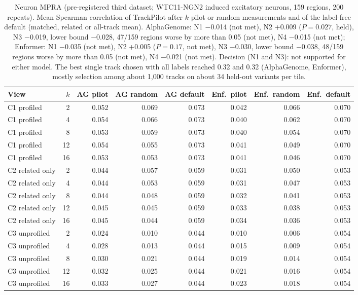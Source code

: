 \begin{table}[H]
\caption{Neuron MPRA (pre-registered third dataset; WTC11-NGN2 induced excitatory neurons, 159 regions, 200 repeats). Mean Spearman correlation of TrackPilot after $k$ pilot or random measurements and of the label-free default (matched, related or all-track mean). AlphaGenome: N1 $-$0.014 (not met), N2 +0.009 ($P=0.027$, held), N3 $-$0.019, lower bound $-$0.028, 47/159 regions worse by more than 0.05 (not met), N4 $-$0.015 (not met); Enformer: N1 $-$0.035 (not met), N2 +0.005 ($P=0.17$, not met), N3 $-$0.030, lower bound $-$0.038, 48/159 regions worse by more than 0.05 (not met), N4 $-$0.021 (not met). Decision (N1 and N3): not supported for either model. The best single track chosen with all labels reached 0.32 and 0.32 (AlphaGenome, Enformer), mostly selection among about 1,000 tracks on about 34 held-out variants per tile.}\label{tab:s10}
\centering\small
\begin{tabular}{lrrrrrrr}
\toprule
View & $k$ & AG pilot & AG random & AG default & Enf.\ pilot & Enf.\ random & Enf.\ default \\
\midrule
C1 profiled & 2 & 0.052 & 0.069 & 0.073 & 0.042 & 0.066 & 0.070 \\
C1 profiled & 4 & 0.054 & 0.066 & 0.073 & 0.040 & 0.062 & 0.070 \\
C1 profiled & 8 & 0.053 & 0.059 & 0.073 & 0.040 & 0.054 & 0.070 \\
C1 profiled & 12 & 0.054 & 0.055 & 0.073 & 0.041 & 0.049 & 0.070 \\
C1 profiled & 16 & 0.053 & 0.053 & 0.073 & 0.041 & 0.046 & 0.070 \\
C2 related only & 2 & 0.044 & 0.057 & 0.059 & 0.031 & 0.050 & 0.053 \\
C2 related only & 4 & 0.044 & 0.053 & 0.059 & 0.031 & 0.047 & 0.053 \\
C2 related only & 8 & 0.044 & 0.048 & 0.059 & 0.032 & 0.041 & 0.053 \\
C2 related only & 12 & 0.045 & 0.045 & 0.059 & 0.033 & 0.038 & 0.053 \\
C2 related only & 16 & 0.045 & 0.044 & 0.059 & 0.034 & 0.036 & 0.053 \\
C3 unprofiled & 2 & 0.024 & 0.010 & 0.044 & 0.010 & 0.006 & 0.054 \\
C3 unprofiled & 4 & 0.028 & 0.013 & 0.044 & 0.015 & 0.009 & 0.054 \\
C3 unprofiled & 8 & 0.030 & 0.021 & 0.044 & 0.019 & 0.014 & 0.054 \\
C3 unprofiled & 12 & 0.032 & 0.025 & 0.044 & 0.021 & 0.016 & 0.054 \\
C3 unprofiled & 16 & 0.033 & 0.027 & 0.044 & 0.023 & 0.018 & 0.054 \\
\bottomrule
\end{tabular}
\end{table}

